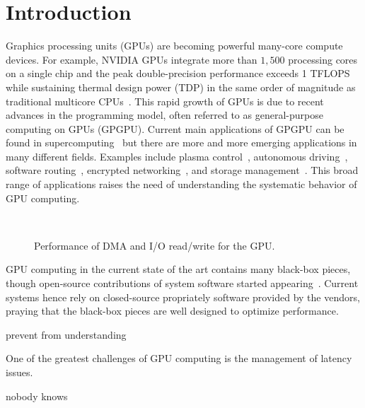 \section{Introduction}
\label{sec:introduction}

Graphics processing units (GPUs) are becoming powerful many-core compute
devices.
For example, NVIDIA GPUs integrate more than $1,500$ processing cores on
a single chip and the peak double-precision performance exceeds 1
TFLOPS while sustaining thermal design power (TDP) in the same order of
magnitude as traditional multicore CPUs~\cite{NVIDIA_Kepler}. 
This rapid growth of GPUs is due to recent advances in the
programming model, often referred to as general-purpose computing on
GPUs (GPGPU).
Current main applications of GPGPU can be found
in supercomputing~\cite{TOP500} but there are more and more emerging
applications in many different fields.
Examples include plasma control~\cite{Kato_ICCPS13}, autonomous
driving~\cite{McNaughton_ICRA11}, software routing~\cite{Han_SIGCOMM10},
encrypted networking~\cite{Jang_NSDI11}, and storage
management~\cite{Bhatotia_FAST12, Gharaibeh_HPDC10, Kato_ATC12,
Sun_SYSTOR12}.
This broad range of applications raises the need of understanding
the systematic behavior of GPU computing.

\begin{figure}[!t]
 \centering
 \\
 \caption{Performance of DMA and I/O read/write for the GPU.}
 \label{fig:intro_data_transfer}
\end{figure}

GPU computing in the current state of the art contains many black-box
pieces, though open-source contributions of system software started
appearing~\cite{Kato_ATC11, Kato_ATC12}.
Current systems hence rely on closed-source propriately software
provided by the vendors, praying that the black-box pieces are well
designed to optimize performance.

prevent from understanding 

One of the greatest challenges of GPU computing is the management of
latency issues.

nobody knows